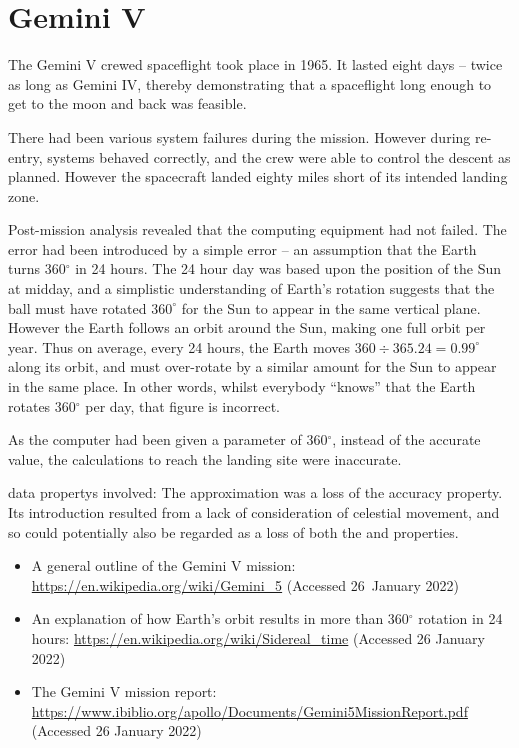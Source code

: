 \section{Gemini V}\label{bkm:incacc:geminiV}
The Gemini V crewed spaceflight took place in 1965. It lasted eight days -- twice as long as Gemini IV, thereby demonstrating that a spaceflight long enough to get to the moon and back was feasible.

There had been various system failures during the mission. However during re-entry, systems behaved correctly, and the crew were able to control the descent as planned. However the spacecraft landed eighty miles short of its intended landing zone.

Post-mission analysis revealed that the computing equipment had not failed. The error had been introduced by a simple \gls{error} --
an assumption that the Earth turns 360$^\circ$ in 24 hours. The 24 hour day was based upon the position of the Sun at midday,
and a simplistic understanding of Earth's rotation suggests that the ball must have rotated $360^\circ$ for the Sun to appear in the same vertical plane. However the Earth follows an orbit around the Sun, making one full orbit per year.
Thus on average, every 24 hours, the Earth moves $360\div 365.24 = 0.99^\circ$ along its orbit,
and must over-rotate by a similar amount for the Sun to appear in the same place.
In other words, whilst everybody ``knows'' that the Earth rotates 360$^\circ$ per day, that figure is incorrect.

As the computer had been given a parameter of 360$^\circ$, instead of the accurate value, the calculations to reach the landing site were inaccurate.

\Glspl{data property} involved: The approximation was a loss of the \gls{accuracy} property.
Its introduction resulted from a lack of consideration of celestial movement,
and so could potentially also be regarded as a loss of both the  and  properties.

\begin{itemize}
\item A general outline of the Gemini V mission:
  \href{https://en.wikipedia.org/wiki/Gemini\_5}
       {https://en.wikipedia.org/wiki/Gemini\_5}
       (Accessed 26~January 2022)
     \item An explanation of how Earth's orbit results in more than 360$^\circ$ rotation in 24 hours: 
       \href{https://en.wikipedia.org/wiki/Sidereal\_time}
            {https://en.wikipedia.org/wiki/Sidereal\_time}
       (Accessed 26 January 2022)
          \item The Gemini V mission report:
            \href{https://www.ibiblio.org/apollo/Documents/Gemini5MissionReport.pdf}
                 {https://www.ibiblio.org/apollo/Documents/Gemini5MissionReport.pdf}
       (Accessed 26 January 2022)
\end{itemize}

